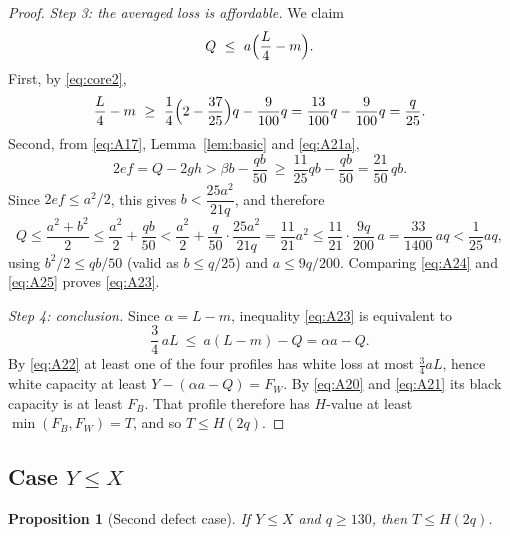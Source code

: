 \documentclass[11pt]{amsart}
\newtheorem{proposition}[theorem]{Proposition}
\theoremstyle{definition}
\theoremstyle{remark}
\begin{document}
\begin{proof}
\emph{Step 3: the averaged loss is affordable.} We claim
\begin{equation}\label{eq:A23}
Q\ \le\ a\Bigl(\frac L4-m\Bigr).
\end{equation}
First, by \eqref{eq:core2},
\begin{equation}\label{eq:A24}
\frac L4-m\ \ge\ \frac14\Bigl(2-\frac{37}{25}\Bigr)q-\frac9{100}q=\frac{13}{100}q-\frac{9}{100}q=\frac q{25}.
\end{equation}
Second, from \eqref{eq:A17}, Lemma~\ref{lem:basic} and \eqref{eq:A21a},
\[
2ef=Q-2gh>\beta b-\frac{qb}{50}\ \ge\ \frac{11}{25}qb-\frac{qb}{50}=\frac{21}{50}\,qb .
\]
Since $2ef\le a^2/2$, this gives $b<\dfrac{25a^2}{21q}$, and therefore
\begin{equation}\label{eq:A25}
Q\le\frac{a^2+b^2}{2}\le\frac{a^2}{2}+\frac{qb}{50}<\frac{a^2}{2}+\frac{q}{50}\cdot\frac{25a^2}{21q}=\frac{11}{21}a^2\le\frac{11}{21}\cdot\frac{9q}{200}\,a=\frac{33}{1400}\,aq<\frac{1}{25}aq ,
\end{equation}
using $b^2/2\le qb/50$ (valid as $b\le q/25$) and $a\le9q/200$. Comparing \eqref{eq:A24} and \eqref{eq:A25} proves \eqref{eq:A23}.

\emph{Step 4: conclusion.} Since $\alpha=L-m$, inequality \eqref{eq:A23} is equivalent to
\begin{equation}\label{eq:A26}
\frac34\,aL\ \le\ a(L-m)-Q=\alpha a-Q .
\end{equation}
By \eqref{eq:A22} at least one of the four profiles has white loss at most $\frac34aL$, hence white capacity at least $Y-(\alpha a-Q)=F_W$. By \eqref{eq:A20} and \eqref{eq:A21} its black capacity is at least $F_B$. That profile therefore has $H$-value at least $\min(F_B,F_W)=T$, and so $T\le H(2q)$.
\end{proof}

\subsection{Case \texorpdfstring{$Y\le X$}{Y <= X}}\label{ssec:caseB}

\begin{proposition}[Second defect case]\label{prop:caseB}
If $Y\le X$ and $q\ge130$, then $T\le H(2q)$.
\end{proposition}
\end{document}
